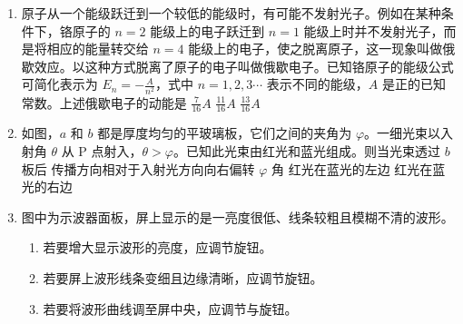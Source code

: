 \documentclass[\gkver]{gaokaozhenti}
\begin{document}
\begin{enumerate}
\item
原子从一个能级跃迁到一个较低的能级时，有可能不发射光子。例如在某种条件下，铬原子的 $n=2$ 能级上的电子跃迁到 $n=1$ 能级上时并不发射光子，而是将相应的能量转交给 $n=4$ 能级上的电子，使之脱离原子，这一现象叫做俄歇效应。以这种方式脱离了原子的电子叫做俄歇电子。已知铬原子的能级公式可简化表示为 $E_{n}=-\frac{A}{n^{2}}$，式中 $n=1,2,3\cdots$ 表示不同的能级，$A$ 是正的已知常数。上述俄歇电子的动能是
{$\frac{7}{16}A$}
{$\frac{11}{16}A$}
{$\frac{13}{16}A$}

\item
如图，$a$ 和 $b$ 都是厚度均匀的平玻璃板，它们之间的夹角为 $\varphi$。一细光束以入射角 $\theta$ 从 P 点射入，$\theta>\varphi$。已知此光束由红光和蓝光组成。则当光束透过 $b$ 板后
{传播方向相对于入射光方向向右偏转 $\varphi$ 角}
{红光在蓝光的左边}
{红光在蓝光的右边}

\item
图中为示波器面板，屏上显示的是一亮度很低、线条较粗且模糊不清的波形。
\begin{enumerate}
	\item
	若要增大显示波形的亮度，应调节旋钮。
	\item
	若要屏上波形线条变细且边缘清晰，应调节旋钮。
	\item
	若要将波形曲线调至屏中央，应调节与旋钮。
\end{enumerate}


\end{enumerate}
\end{document}
